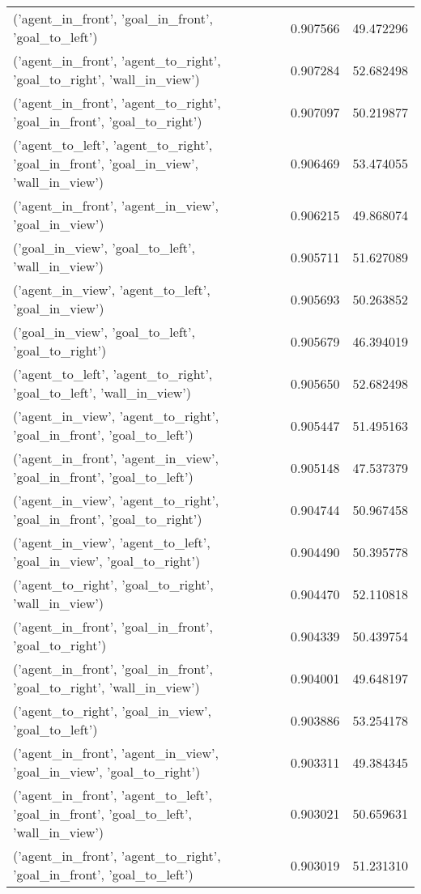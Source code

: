 \begin{tabular}{lrr}
('agent\_in\_front', 'goal\_in\_front', 'goal\_to\_left') & 0.907566 & 49.472296 \\
('agent\_in\_front', 'agent\_to\_right', 'goal\_to\_right', 'wall\_in\_view') & 0.907284 & 52.682498 \\
('agent\_in\_front', 'agent\_to\_right', 'goal\_in\_front', 'goal\_to\_right') & 0.907097 & 50.219877 \\
('agent\_to\_left', 'agent\_to\_right', 'goal\_in\_front', 'goal\_in\_view', 'wall\_in\_view') & 0.906469 & 53.474055 \\
('agent\_in\_front', 'agent\_in\_view', 'goal\_in\_view') & 0.906215 & 49.868074 \\
('goal\_in\_view', 'goal\_to\_left', 'wall\_in\_view') & 0.905711 & 51.627089 \\
('agent\_in\_view', 'agent\_to\_left', 'goal\_in\_view') & 0.905693 & 50.263852 \\
('goal\_in\_view', 'goal\_to\_left', 'goal\_to\_right') & 0.905679 & 46.394019 \\
('agent\_to\_left', 'agent\_to\_right', 'goal\_to\_left', 'wall\_in\_view') & 0.905650 & 52.682498 \\
('agent\_in\_view', 'agent\_to\_right', 'goal\_in\_front', 'goal\_to\_left') & 0.905447 & 51.495163 \\
('agent\_in\_front', 'agent\_in\_view', 'goal\_in\_front', 'goal\_to\_left') & 0.905148 & 47.537379 \\
('agent\_in\_view', 'agent\_to\_right', 'goal\_in\_front', 'goal\_to\_right') & 0.904744 & 50.967458 \\
('agent\_in\_view', 'agent\_to\_left', 'goal\_in\_view', 'goal\_to\_right') & 0.904490 & 50.395778 \\
('agent\_to\_right', 'goal\_to\_right', 'wall\_in\_view') & 0.904470 & 52.110818 \\
('agent\_in\_front', 'goal\_in\_front', 'goal\_to\_right') & 0.904339 & 50.439754 \\
('agent\_in\_front', 'goal\_in\_front', 'goal\_to\_right', 'wall\_in\_view') & 0.904001 & 49.648197 \\
('agent\_to\_right', 'goal\_in\_view', 'goal\_to\_left') & 0.903886 & 53.254178 \\
('agent\_in\_front', 'agent\_in\_view', 'goal\_in\_view', 'goal\_to\_right') & 0.903311 & 49.384345 \\
('agent\_in\_front', 'agent\_to\_left', 'goal\_in\_front', 'goal\_to\_left', 'wall\_in\_view') & 0.903021 & 50.659631 \\
('agent\_in\_front', 'agent\_to\_right', 'goal\_in\_front', 'goal\_to\_left') & 0.903019 & 51.231310 \\

\end{tabular}
